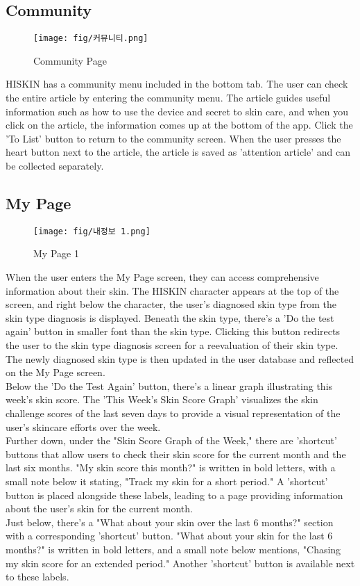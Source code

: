 \documentclass[conference]{IEEEtran}
\begin{document}
\subsection{Community}
    \begin{figure}[h]
    \centering
    \texttt{[image: fig/커뮤니티.png]}
    \label{fig:Community Page}
    \caption{Community Page} 
    \end{figure}
HISKIN has a community menu included in the bottom tab. The user can check the entire article by entering the community menu. The article guides useful information such as how to use the device and secret to skin care, and when you click on the article, the information comes up at the bottom of the app. Click the 'To List' button to return to the community screen. When the user presses the heart button next to the article, the article is saved as 'attention article' and can be collected separately. 


\subsection{My Page}
    \begin{figure}[h]
    \centering
    \texttt{[image: fig/내정보 1.png]}
    \label{fig:My Page 1}
    \caption{My Page 1} 
    \end{figure}
When the user enters the My Page screen, they can access comprehensive information about their skin. The HISKIN character appears at the top of the screen, and right below the character, the user's diagnosed skin type from the skin type diagnosis is displayed. Beneath the skin type, there's a 'Do the test again' button in smaller font than the skin type. Clicking this button redirects the user to the skin type diagnosis screen for a reevaluation of their skin type. The newly diagnosed skin type is then updated in the user database and reflected on the My Page screen.\\
Below the 'Do the Test Again' button, there's a linear graph illustrating this week's skin score. The 'This Week's Skin Score Graph' visualizes the skin challenge scores of the last seven days to provide a visual representation of the user's skincare efforts over the week.\\
Further down, under the "Skin Score Graph of the Week," there are 'shortcut' buttons that allow users to check their skin score for the current month and the last six months. "My skin score this month?" is written in bold letters, with a small note below it stating, "Track my skin for a short period." A 'shortcut' button is placed alongside these labels, leading to a page providing information about the user's skin for the current month.\\
Just below, there's a "What about your skin over the last 6 months?" section with a corresponding 'shortcut' button. "What about your skin for the last 6 months?" is written in bold letters, and a small note below mentions, "Chasing my skin score for an extended period." Another 'shortcut' button is available next to these labels.\\
\end{document}
